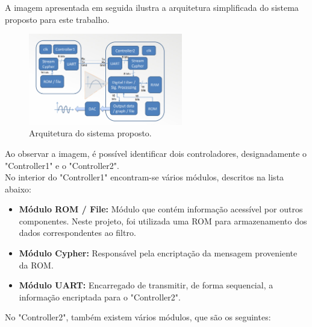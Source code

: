 \documentclass[12pt, a4paper]{article}
\begin{document}
A imagem apresentada em seguida ilustra a arquitetura simplificada do sistema proposto para este trabalho.\\

\begin{figure}[h]  %
    \centering
    \includegraphics[width=0.6\textwidth]{./images/architecture.png}  %
    \caption{Arquitetura do sistema proposto.}
    \label{fig:arquitetura}
\end{figure}

Ao observar a imagem, é possível identificar dois controladores, designadamente o "Controller1" e o "Controller2". \\ 
No interior do "Controller1" encontram-se vários módulos, descritos na lista abaixo:

\begin{itemize}
    \item \textbf{Módulo ROM / File:} Módulo que contém informação acessível por outros componentes.  
    Neste projeto, foi utilizada uma ROM para armazenamento dos dados correspondentes ao filtro.
    
    \item \textbf{Módulo Cypher:} Responsável pela encriptação da mensagem proveniente da ROM.
    
    \item \textbf{Módulo UART:} Encarregado de transmitir, de forma sequencial, a informação encriptada para o "Controller2".
\end{itemize}


No "Controller2", também existem vários módulos, que são os seguintes:
\end{document}
